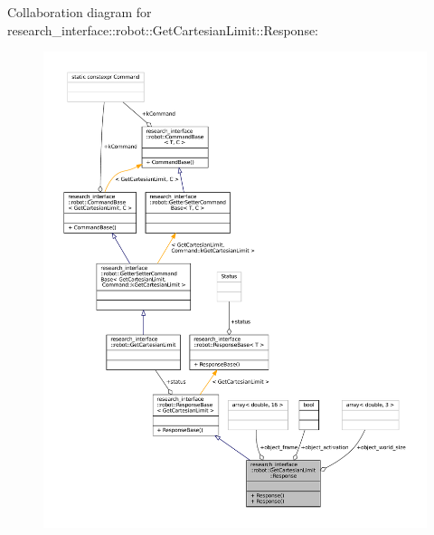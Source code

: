 Collaboration diagram for research\+\_\+interface\+:\+:robot\+:\+:Get\+Cartesian\+Limit\+:\+:Response\+:
\nopagebreak
\begin{figure}[H]
\begin{center}
\leavevmode
\includegraphics[width=350pt]{structresearch__interface_1_1robot_1_1GetCartesianLimit_1_1Response__coll__graph}
\end{center}
\end{figure}
